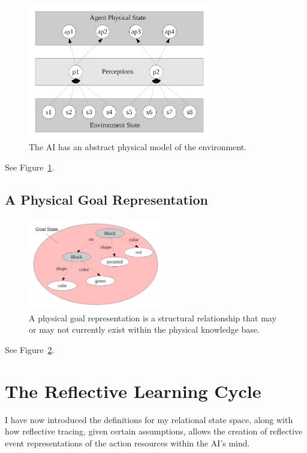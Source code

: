 \begin{figure}[bth]
  \center
  \includegraphics[width=8cm]{gfx/environment_perception_physical}
  \caption[The AI has an abstract physical model of the
    environment]{The AI has an abstract physical model of the
    environment.}
  \label{fig:environment_perception_physical}
\end{figure}

See Figure~\ref{fig:environment_perception_physical}.


\subsection{A Physical Goal Representation}

\begin{figure}[bth]
  \center
  \includegraphics[height=4cm]{gfx/goal_state}
  \caption[A physical goal representation]{A physical goal
    representation is a structural relationship that may or may not
    currently exist within the physical knowledge base.}
  \label{fig:goal_state}
\end{figure}

See Figure~\ref{fig:goal_state}.


\section{The Reflective Learning Cycle}

I have now introduced the definitions for my relational state space,
along with how reflective tracing, given certain assumptions, allows
the creation of reflective event representations of the action
resources within the AI's mind.

